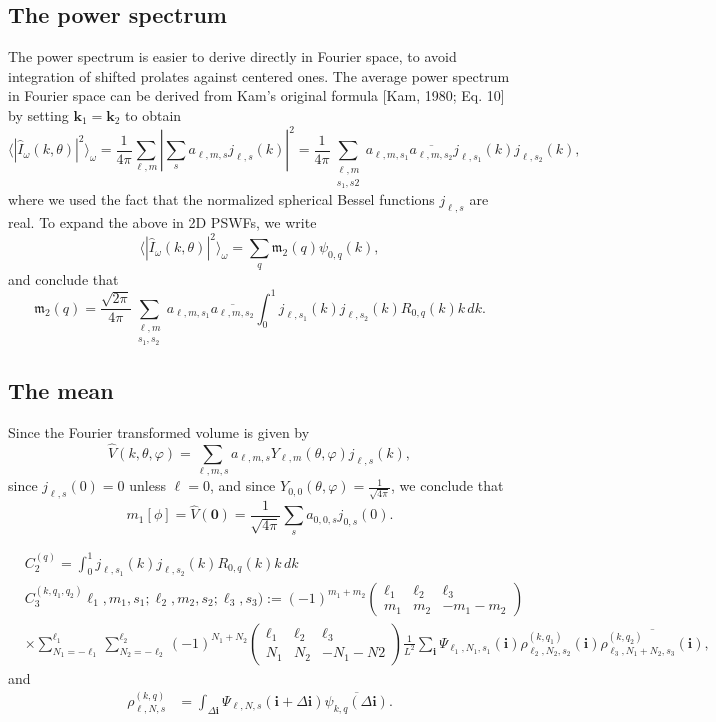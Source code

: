 \documentclass[english,11pt]{article}
\newcommand{\1}{\mathbf{1}}
\newcommand{\mb}{\mathbf}
\numberwithin{equation}{section}
\theoremstyle{plain}
\theoremstyle{definition}
\theoremstyle{remark}
\theoremstyle{plain}
\theoremstyle{remark}
\theoremstyle{plain}
\theoremstyle{plain}
\begin{document}
\subsection{The power spectrum}
The power spectrum is easier to derive directly in Fourier space, to
avoid integration of shifted prolates against centered ones. The
average power spectrum in Fourier space can be derived from Kam's
original formula [Kam, 1980; Eq. 10] by setting $\mb k_1 = \mb k_2$ to
obtain
\[ \langle |\widehat I_{\omega}(k,\theta)|^2\rangle_{\omega} =
\frac{1}{4\pi}\sum_{\ell,
	m}\left|\sum_sa_{\ell,m,s}j_{\ell,s}(k)\right|^2 =
\frac{1}{4\pi}\sum_{\substack{\ell,m\\s_1,s2}}a_{\ell,m,s_1}\overline{a_{\ell,m,s_2}}j_{\ell,s_1}(k)j_{\ell,s_2}(k),\]
where we used the fact that the normalized spherical Bessel functions
$j_{\ell,s}$ are real. To expand the above in 2D PSWFs, we write
\[ \langle |\widehat I_{\omega}(k,\theta)|^2\rangle_{\omega} =
\sum_{q}\mathfrak{m}_2(q)\psi_{0,q}(k),\]
and conclude that
\[ \mathfrak{m}_2(q) =
\frac{\sqrt{2\pi}}{4\pi}\sum_{\substack{\ell,m\\s_1,s_2}}a_{\ell,m,s_1}\overline{a_{\ell,m,s_2}}
\int_0^1j_{\ell,s_1}(k)j_{\ell,s_2}(k)R_{0,q}(k)k\, dk.\]

\subsection{The mean}

Since the Fourier transformed volume is given by
\[ \widehat V(k,\theta,\varphi) =
\sum_{\ell,m,s}a_{\ell,m,s}Y_{\ell,m}(\theta,\varphi)j_{\ell,s}(k),\]
since $j_{\ell,s}(0)=0$ unless $\ell=0$, and since
$Y_{0,0}(\theta,\varphi) = \frac{1}{\sqrt{4\pi}}$, we conclude that
\[ m_1[\phi] = \widehat V(\mb 0) = \frac{1}{\sqrt{4\pi}}\sum_sa_{0,0,s}j_{0,s}(0).\]


\begin{align*}
&C_2^{(q)} = \int_0^1j_{\ell,s_1}(k)j_{\ell,s_2}(k)R_{0,q}(k)k\, dk\\
&C_3^{(k,q_1,q_2)}\ell_1,m_1,s_1;\ell_2,m_2,s_2;\ell_3,s_3):= (-1)^{m_1+m_2}\left(\begin{array}{ccc}\ell_1 & \ell_2  & \ell_3\\ m_1 & m_2 & -m_1-m_2\end{array}\right)\\
&\times \sum_{N_1=-\ell_1}^{\ell_1}\sum_{N_2=-\ell_2}^{\ell_2}(-1)^{N_1+N_2}\left(\begin{array}{ccc}\ell_1 & \ell_2  & \ell_3\\ N_1 & N_2 & -N_1-N2\end{array}\right)\frac{1}{L^2}\sum_{\mb i}\Psi_{\ell_1,N_1,s_1}(\mb i)\rho_{\ell_2,N_2,s_2}^{(k,q_1)}(\mb i)\overline{\rho_{\ell_3,N_1+N_2,s_3}^{(k,q_2)}(\mb i)},
\end{align*}
and 
\begin{align*}
\rho_{\ell,N,s}^{(k,q)}&=\int_{\Delta\mb i}\Psi_{\ell,N,s}(\mb i+\Delta\mb i)\overline{\psi_{k,q}(\Delta\mb i)}.
\end{align*}
\end{document}
